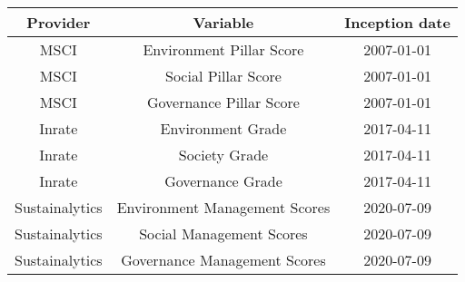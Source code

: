 \begin{tabular}{||c c c||}
    \hline
    \rowcolor{LGray}
    \textbf{Provider} & \textbf{Variable} & \textbf{Inception date} \\ 
    \hline\hline
    MSCI & Environment Pillar Score & 2007-01-01 \\
    \hline
    MSCI & Social Pillar Score & 2007-01-01 \\
    \hline
    MSCI & Governance Pillar Score & 2007-01-01 \\
    \hline
    Inrate & Environment Grade & 2017-04-11 \\ 
    \hline
    Inrate & Society Grade & 2017-04-11 \\
    \hline
    Inrate & Governance Grade & 2017-04-11 \\
    \hline
    Sustainalytics & Environment Management Scores & 2020-07-09 \\
    \hline
    Sustainalytics & Social Management Scores & 2020-07-09  \\
    \hline
    Sustainalytics & Governance Management Scores & 2020-07-09  \\
    \hline
\end{tabular}
